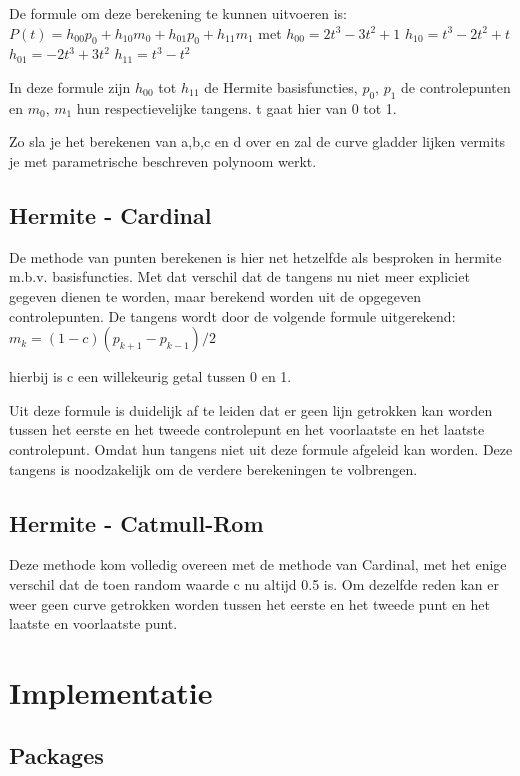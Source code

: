 \documentclass[a4paper,11pt,oneside, titlepage]{article}
\begin{document}
De formule om deze berekening te kunnen uitvoeren is:\newline
$P(t) = h_{00}p_0 + h_{10}m_0 + h_{01}p_0 + h_{11}m_1$\newline
met\newline
$h_{00} = 2t^3 - 3t^2 + 1$\newline
$h_{10} = t^3 - 2t^2 + t$\newline
$h_{01} = -2t^3 + 3t^2$\newline
$h_{11} = t^3 - t^2$\newline

In deze formule zijn $h_{00}$ tot $h_{11}$ de Hermite basisfuncties, $p_0$, $p_1$ 
de controlepunten en $m_0$, $m_1$ hun respectievelijke tangens. t gaat hier van 0 tot 1.

Zo sla je het berekenen van a,b,c en d over en zal de curve gladder lijken vermits je
met parametrische beschreven polynoom werkt.
\subsection{Hermite - Cardinal}
De methode van punten berekenen is hier net hetzelfde als besproken in hermite m.b.v. 
basisfuncties.
Met dat verschil dat de tangens nu niet meer expliciet gegeven dienen te worden, maar 
berekend worden uit de opgegeven controlepunten. 
De tangens wordt door de volgende formule uitgerekend:\newline 
$m_k = (1 - c)(p_{k+1} -p_{k-1})/2$

hierbij is c een willekeurig getal tussen 0 en 1.

Uit deze formule is duidelijk af te leiden dat er geen lijn getrokken kan worden 
tussen het eerste en het tweede controlepunt en het voorlaatste en het laatste controlepunt. 
Omdat hun tangens niet uit deze formule afgeleid kan worden. Deze tangens is noodzakelijk
om de verdere berekeningen te volbrengen.
\subsection{Hermite - Catmull-Rom}
Deze methode kom volledig overeen met de methode van Cardinal, met het enige verschil dat
de toen random waarde c nu altijd 0.5 is. Om dezelfde reden kan er weer geen curve getrokken
worden tussen het eerste en het tweede punt en het laatste en voorlaatste punt.
\newpage
\section{Implementatie}
\subsection{Packages}
\end{document}
